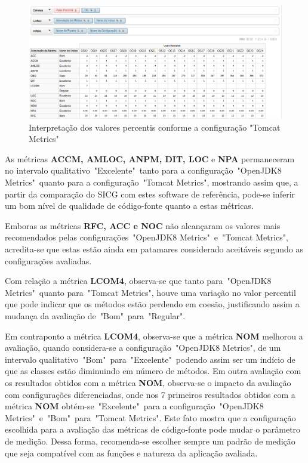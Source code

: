 \begin{figure}
\centering
\includegraphics[keepaspectratio=true,scale=0.7]{figuras/total-tomcat.eps}
\caption{Interpretação dos valores percentis conforme a configuração "Tomcat Metrics"}
\label{fig:total-tomcat}
\end{figure}
\FloatBarrier

As métricas \textbf{ACCM, AMLOC, ANPM, DIT, LOC} e \textbf{NPA} permaneceram no intervalo qualitativo~"Excelente"~tanto para a configuração~"OpenJDK8 Metrics"~quanto para a configuração~"Tomcat Metrics", mostrando assim que, a partir da comparação do SICG com estes software de referência, pode-se inferir um bom nível de qualidade de código-fonte quanto a estas métricas.

Emboras as métricas \textbf{RFC, ACC e NOC} não alcançaram os valores mais recomendados pelas configurações~"OpenJDK8 Metrics"~e~"Tomcat Metrics", acredita-se que estas estão ainda em patamares considerado aceitáveis segundo as configurações avaliadas. 

Com relação a métrica \textbf{LCOM4}, observa-se que tanto para~"OpenJDK8 Metrics"~quanto para~"Tomcat Metrics", houve uma variação no valor percentil que pode indicar que os métodos estão perdendo em coesão, justificando assim a mudança da avaliação de~"Bom"~para~"Regular".

Em contraponto a métrica \textbf{LCOM4}, observa-se que a métrica \textbf{NOM} melhorou a avaliação, quando considera-se a configuração~"OpenJDK8 Metrics", de um intervalo qualitativo~"Bom"~para~"Excelente"~podendo assim ser um indício de que as classes estão diminuindo em número de métodos. Em outra avaliação com os resultados obtidos com a métrica \textbf{NOM}, observa-se o impacto da avaliação com configurações diferenciadas, onde  nos 7 primeiros resultados obtidos com a métrica \textbf{NOM} obtém-se~"Excelente"~para a configuração~"OpenJDK8 Metrics"~e~"Bom"~para~"Tomcat Metrics". Este fato mostra que a configuração escolhida para a avaliação das métricas de código-fonte pode mudar o parâmetro de medição. Dessa forma, recomenda-se escolher sempre um padrão de medição que seja compatível com as funções e natureza da aplicação avaliada.


